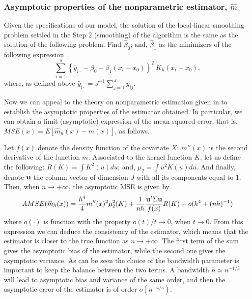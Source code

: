 \documentclass[sn-mathphys]{sn-jnl}%
\theoremstyle{thmstyleone}%
\theoremstyle{thmstyletwo}%
\theoremstyle{thmstylethree}%
\begin{document}
\subsubsection{Asymptotic properties of the nonparametric estimator, $\widehat{m}$}
Given the specifications of our model, the solution of the local-linear smoothing problem settled in the Step 2 (smoothing) of the algorithm is the same as the solution of the following problem. Find $\widehat{\beta}_0$; and, $\widehat{\beta}_1$ as the minimizers of the following expression
 \[
 \sum_{i=1}^n\left\{\bar{y}_{i\cdot}-\beta_0-\beta_1(x_i-x_0)\right\}^2 \ K_h\left(x_i-x_0\right),%
 \]
where, as defined above  $\bar{y}_{i \cdot} =J^{-1}\sum_{j=1}^Jy_{ij}$. 

Now we can appeal to the theory on nonparametric estimation given in \cite{FG1996} to establish the asymptotic properties of the estimator obtained. In particular, we can obtain a limit (asymptotic)  expression of the mean squared error, that is, $MSE(x)=E\left[\widehat{m}_h(x)-m(x)\right]$, as follows. 

Let $f(x)$ denote the density function of the covariate $X$; $m''(x)$ is the second derivative of the function $m$. Associated to the kernel function $K$, let us define the following: $R(K)=\int K^2(u)du$; and, $\mu_2=\int u^2K(u)du$. And finally, denote ${\bf u}$ the column vector of dimension $J$ with all its components equal to 1. Then, when $n \rightarrow +\infty$, the asymptotic MSE is given by
\begin{equation*}
AMSE(\widehat{m}_h(x))=\frac{h^4}{4}m''(x)^2\mu_2^2(K)+\frac{1}{nh}\frac{{\bf u}^t { \Sigma} {\bf u}}{f(x)}R(K)+o(h^4+(nh)^{-1})
\end{equation*}
where $o(\cdot)$ is function with the property $o(t)/t \rightarrow 0$, when $t \rightarrow 0$. From this expression we can deduce the consistency of the estimator, which means that the estimator is closer to the true function as $n \rightarrow +\infty$. 
The first term of the sum gives the asymptotic bias of the estimator, while the second one gives the asymptotic variance. As can be seen the choice of the bandwidth parameter is important to keep the balance between the two terms. A bandwidth $h \approx n^{-1/5}$ will lead to asymptotic bias and variance of the same order, and then the asymptotic error of the estimator is of order $o(n^{-4/5})$. 
\end{document}
